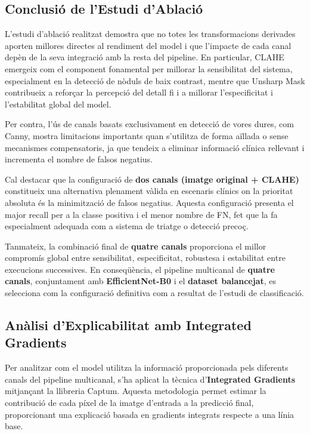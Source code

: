 \documentclass[12pt,a4paper]{article}
\begin{document}
\subsection{Conclusió de l’Estudi d’Ablació}

L’estudi d’ablació realitzat demostra que no totes les transformacions derivades aporten
millores directes al rendiment del model i que l’impacte de cada canal depèn de la seva
integració amb la resta del pipeline. En particular, CLAHE emergeix com el component
fonamental per millorar la sensibilitat del sistema, especialment en la detecció de
nòduls de baix contrast, mentre que Unsharp Mask contribueix a reforçar la percepció del
detall fi i a millorar l’especificitat i l’estabilitat global del model.

Per contra, l’ús de canals basats exclusivament en detecció de vores dures, com Canny,
mostra limitacions importants quan s’utilitza de forma aïllada o sense mecanismes
compensatoris, ja que tendeix a eliminar informació clínica rellevant i incrementa el
nombre de falsos negatius.

Cal destacar que la configuració de \textbf{dos canals (imatge original + CLAHE)}
constitueix una alternativa plenament vàlida en escenaris clínics on la prioritat
absoluta és la minimització de falsos negatius. Aquesta configuració presenta el major
recall per a la classe positiva i el menor nombre de FN, fet que la fa especialment
adequada com a sistema de triatge o detecció precoç.

Tanmateix, la combinació final de \textbf{quatre canals} proporciona el millor compromís
global entre sensibilitat, especificitat, robustesa i estabilitat entre execucions
successives. En conseqüència, el pipeline multicanal de \textbf{quatre canals},
conjuntament amb \textbf{EfficientNet-B0} i el \textbf{dataset balancejat}, es selecciona
com la configuració definitiva com a resultat de l'estudi de classificació.


\subsection{Anàlisi d’Explicabilitat amb Integrated Gradients}

Per analitzar com el model utilitza la informació proporcionada pels diferents canals del
pipeline multicanal, s’ha aplicat la tècnica d’\textbf{Integrated Gradients} mitjançant la
llibreria Captum. Aquesta metodologia permet estimar la contribució de cada píxel de la
imatge d’entrada a la predicció final, proporcionant una explicació basada en gradients
integrats respecte a una línia base.
\end{document}
